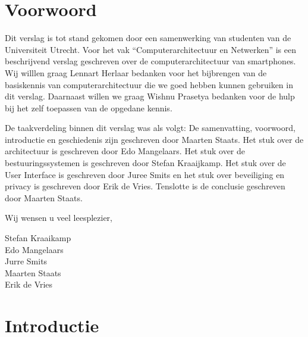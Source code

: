 \chapter{Voorwoord}

Dit verslag is tot stand gekomen door een samenwerking van studenten van de Universiteit Utrecht. Voor het vak ``Computerarchitectuur en Netwerken'' is een beschrijvend verslag geschreven over de computerarchitectuur van smartphones. Wij willlen graag Lennart Herlaar bedanken voor het bijbrengen van de basiskennis van computerarchitectuur die we goed hebben kunnen gebruiken in dit verslag. Daarnaast willen we graag Wishnu Prasetya bedanken voor de hulp bij het zelf toepassen van de opgedane kennis.

De taakverdeling binnen dit verslag was als volgt: De samenvatting, voorwoord, introductie en geschiedenis zijn geschreven door Maarten Staats. Het stuk over de architectuur is geschreven door Edo Mangelaars. Het stuk over de bestuuringssystemen is geschreven door Stefan Kraaijkamp. Het stuk over de User Interface is geschreven door Juree Smits en het stuk over beveiliging en privacy is geschreven door Erik de Vries. Tenslotte is de conclusie geschreven door Maarten Staats.

Wij wensen u veel leesplezier,

Stefan Kraaikamp\\
Edo Mangelaars\\
Jurre Smits\\
Maarten Staats\\
Erik de Vries\\

\chapter{Introductie}

